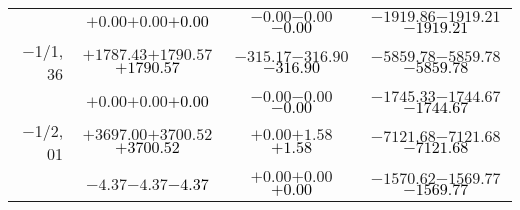 \documentclass[compress]{beamer}
\begin{document}
\begin{frame}
{\begin{tabular}{r | c | c | c}
           & $+0.00$\hspace{0.1 cm}$+0.00$\hspace{0.1 cm}\textcolor{black}{$+0.00$} & $-0.00$\hspace{0.1 cm}$-0.00$\hspace{0.1 cm}\textcolor{black}{$-0.00$} & $-1919.86$\hspace{0.1 cm}$-1919.21$\hspace{0.1 cm}\textcolor{black}{$-1919.21$} \\
$-$1/1, 36 & $+1787.43$\hspace{0.1 cm}$+1790.57$\hspace{0.1 cm}\textcolor{black}{$+1790.57$} & $-315.17$\hspace{0.1 cm}$-316.90$\hspace{0.1 cm}\textcolor{black}{$-316.90$} & $-5859.78$\hspace{0.1 cm}$-5859.78$\hspace{0.1 cm}\textcolor{black}{$-5859.78$} \\
           & $+0.00$\hspace{0.1 cm}$+0.00$\hspace{0.1 cm}\textcolor{black}{$+0.00$} & $-0.00$\hspace{0.1 cm}$-0.00$\hspace{0.1 cm}\textcolor{black}{$-0.00$} & $-1745.33$\hspace{0.1 cm}$-1744.67$\hspace{0.1 cm}\textcolor{black}{$-1744.67$} \\
$-$1/2, 01 & $+3697.00$\hspace{0.1 cm}$+3700.52$\hspace{0.1 cm}\textcolor{black}{$+3700.52$} & $+0.00$\hspace{0.1 cm}$+1.58$\hspace{0.1 cm}\textcolor{black}{$+1.58$} & $-7121.68$\hspace{0.1 cm}$-7121.68$\hspace{0.1 cm}\textcolor{black}{$-7121.68$} \\
           & $-4.37$\hspace{0.1 cm}$-4.37$\hspace{0.1 cm}\textcolor{black}{$-4.37$} & $+0.00$\hspace{0.1 cm}$+0.00$\hspace{0.1 cm}\textcolor{black}{$+0.00$} & $-1570.62$\hspace{0.1 cm}$-1569.77$\hspace{0.1 cm}\textcolor{black}{$-1569.77$} \\

\end{tabular}}
\end{frame}
\end{document}
